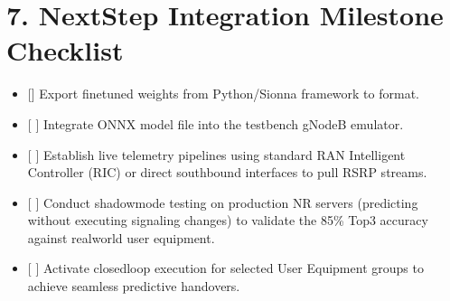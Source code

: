 \documentclass[letterpaper,10pt,english]{sphinxmanual}
\begin{document}
\section{7. Next\sphinxhyphen{}Step Integration Milestone Checklist}
\label{\detokenize{deployement:next-step-integration-milestone-checklist}}\begin{itemize}
\item {} 
\sphinxAtStartPar
{[}{]}  Export fine\sphinxhyphen{}tuned weights from Python/Sionna framework to  format.

\item {} 
\sphinxAtStartPar
{[} {]}  Integrate ONNX model file into the testbench gNodeB emulator.

\item {} 
\sphinxAtStartPar
{[} {]}  Establish live telemetry pipelines using standard RAN Intelligent Controller (RIC) or direct southbound interfaces to pull RSRP streams.

\item {} 
\sphinxAtStartPar
{[} {]}  Conduct shadow\sphinxhyphen{}mode testing on production NR servers (predicting without executing signaling changes) to validate the 85\% Top\sphinxhyphen{}3 accuracy against real\sphinxhyphen{}world user equipment.

\item {} 
\sphinxAtStartPar
{[} {]}  Activate closed\sphinxhyphen{}loop execution for selected User Equipment groups to achieve seamless predictive handovers.

\end{itemize}



\renewcommand{\indexname}{Index}
\printindex
\end{document}
